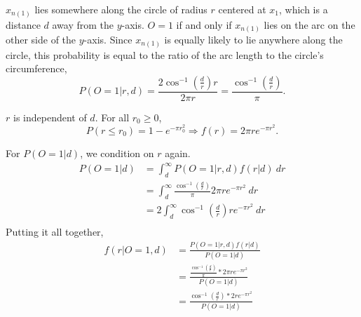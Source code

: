 \documentclass{article}
\begin{document}
$x_{n(1)}$ lies somewhere along the circle of radius $r$ centered at $x_1$, which is a distance $d$ away from the $y$-axis. $O = 1$ if and only if $x_{n(1)}$ lies on the arc on the other side of the $y$-axis. Since $x_{n(1)}$ is equally likely to lie anywhere along the circle, this probability is equal to the ratio of the arc length to the circle's circumference, 
$$P(O=1 | r,d) = \frac{2\cos^{-1}\left(\frac{d}{r}\right)r}{2\pi r} = \frac{\cos^{-1}\left(\frac{d}{r}\right)}{\pi}.$$

$r$ is independent of $d$. For all $r_0 \geq 0$, 
$$P(r \leq r_0) = 1 - e^{-\pi r_0^2} \Rightarrow f(r) = 2\pi r e^{-\pi r^2}.$$

For $P(O = 1 | d)$, we condition on $r$ again.
\begin{equation}
\begin{split}
P(O = 1 | d) &= \int_d^\infty P(O = 1 | r,d) f(r | d) \:dr \\
&= \int_d^\infty \frac{\cos^{-1}\left(\frac{d}{r}\right)}{\pi} 2\pi r e^{-\pi r^2} \:dr \\
&= 2\int_d^\infty \cos^{-1}\left(\frac{d}{r}\right) r e^{-\pi r^2} \:dr \\
\end{split}
\end{equation}
Putting it all together,
\begin{equation}
\begin{split}
f(r | O=1,d) &= \frac{P(O=1 | r,d)f(r | d)}{P(O=1 | d)} \\
&= \frac{\frac{\cos^{-1}\left(\frac{d}{r}\right)}{\pi} * 2\pi r e^{-\pi r^2}}{P(O = 1 | d)} \\
&= \frac{\cos^{-1}\left(\frac{d}{r}\right) * 2re^{-\pi r^2}}{P(O = 1 | d)}
\end{split}
\end{equation}
\end{document}
